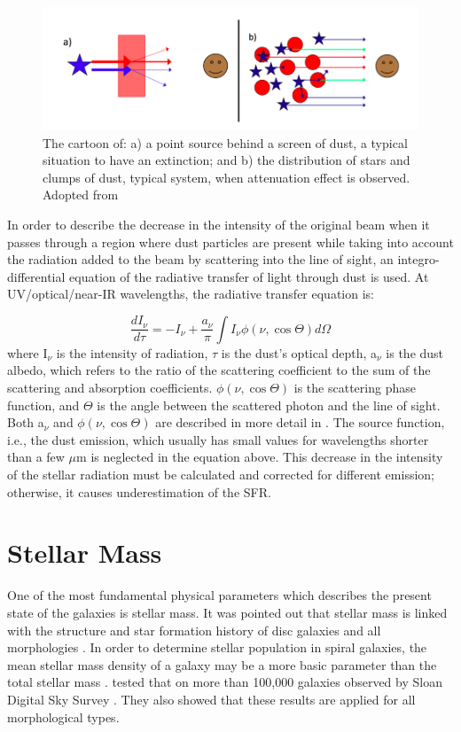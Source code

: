\begin{figure}[h]
\label{fig:duste}
\centering
\includegraphics[width=16cm]{../image_intro/dustextinction}
\caption{The cartoon of: a) a point source behind a screen of dust, a typical situation to have an extinction; and b) the distribution of stars and clumps of dust, typical system, when attenuation effect is observed. Adopted from \cite{Calzetti13}}
\end{figure}

In order to describe the decrease in the intensity of the original beam when it passes through a region where dust particles are present while taking into account the radiation added to the beam by scattering into the line of sight, an integro-differential equation of the radiative transfer of light through dust is used. At UV/optical/near-IR wavelengths, the radiative transfer equation is:

\begin{equation}
\frac{dI_{\nu}}{d\tau} = -I_{\nu}  + \frac{a_{\nu}}{\pi} \int I_{\nu}\phi(\nu,\cos \Theta)d\Omega
\end{equation}
where I$_{\nu}$ is the intensity of radiation, $\tau$ is the dust's optical depth, a$_{\nu}$ is the dust albedo, which refers to the ratio of the scattering coefficient to the sum of the scattering and absorption coefficients. $\phi(\nu,\cos \Theta)$ is the scattering phase function, and $\Theta$ is the angle between the scattered photon and the line of sight. Both a$_{\nu}$ and $\phi(\nu,\cos \Theta)$ are described in more detail in \citep{Draine03}. The source function, i.e., the dust emission, which usually has small values for wavelengths shorter than a few $\mu$m is neglected in the equation above. This decrease in the intensity of the stellar radiation must be calculated and corrected for different emission; otherwise, it causes underestimation of the SFR. 


\section{Stellar Mass}
\label{chap:starmass}
One of the most fundamental physical parameters which describes the present state of the galaxies is stellar mass. It was pointed out that stellar mass is linked with the structure and star formation history of disc galaxies \citep{Gavvazi96} and all morphologies \citep{Scodeggio02}. In order to determine stellar population in spiral galaxies, the mean stellar mass density of a galaxy may be a more basic parameter than the total stellar mass \citep{Bell00}. \cite{Kauffmann03} tested that on more than 100,000 galaxies observed by Sloan Digital Sky Survey \citep[SDSS;][]{York00}. They also showed that these results are applied for all morphological types.

